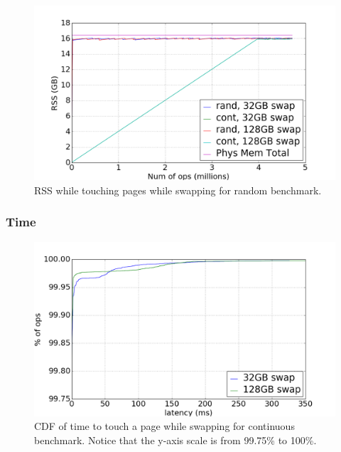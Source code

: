 \documentclass[twocolumn,11pt]{article}
\begin{document}
\begin{figure}
    \includegraphics[width=\columnwidth]{figures/swap_rss}
    \caption{RSS while touching pages while swapping for random benchmark.}
    \label{swap_rss}
\end{figure}

\subsubsection{Time}

\begin{figure}
    \includegraphics[width=\columnwidth]{figures/swap_touch_time_cont_cdf}
    \caption{CDF of time to touch a page while swapping for continuous
    benchmark. Notice that the y-axis scale is from 99.75\% to 100\%.
    \label{fig:swap_time_cont_cdf}}
\end{figure}
\end{document}
